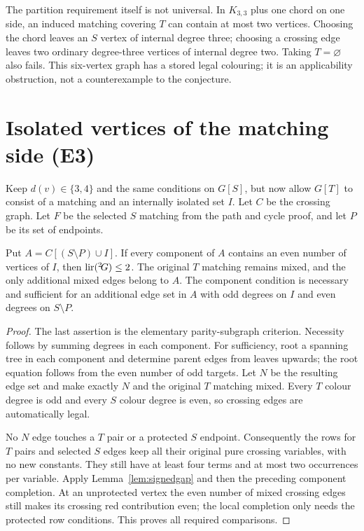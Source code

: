 The partition requirement itself is not universal. In $K_{3,3}$ plus
one chord on one side, an induced matching covering $T$ can contain at
most two vertices. Choosing the chord leaves an $S$ vertex of internal
degree three; choosing a crossing edge leaves two ordinary degree-three
vertices of internal degree two. Taking $T=\varnothing$ also fails.
This six-vertex graph has a stored legal colouring; it is an applicability
obstruction, not a counterexample to the conjecture.

\section{Isolated vertices of the matching side (E3)}\label{sec:isolatepart}

Keep $d(v)\in\{3,4\}$ and the same conditions on $G[S]$, but now allow
$G[T]$ to consist of a matching and an internally isolated set $I$.
Let $C$ be the crossing graph. Let $F$ be the selected $S$ matching from
the path and cycle proof, and let $P$ be its set of endpoints.

\begin{theorem}\label{thm:protectedjoin}
Put $A=C[(S\setminus P)\cup I]$. If every component of $A$ contains
an even number of vertices of $I$, then $\operatorname{lir}({}^{2}\!G)\le2$.
The original $T$ matching remains mixed, and the only additional mixed
edges belong to $A$. The component condition is necessary and sufficient
for an additional edge set in $A$ with odd degrees on $I$ and even
degrees on $S\setminus P$.
\end{theorem}
\begin{proof}
The last assertion is the elementary parity-subgraph criterion. Necessity
follows by summing degrees in each component. For sufficiency, root a
spanning tree in each component and determine parent edges from leaves
upwards; the root equation follows from the even number of odd targets.
Let $N$ be the resulting edge set and make exactly $N$ and the original
$T$ matching mixed. Every $T$ colour degree is odd and every $S$ colour
degree is even, so crossing edges are automatically legal.

No $N$ edge touches a $T$ pair or a protected $S$ endpoint. Consequently
the rows for $T$ pairs and selected $S$ edges keep all their original
pure crossing variables, with no new constants. They still have at
least four terms and at most two occurrences per variable. Apply
Lemma~\ref{lem:signedgap} and then the preceding component completion.
At an unprotected vertex the even number of mixed crossing edges still
makes its crossing red contribution even; the local completion only
needs the protected row conditions. This proves all required comparisons.
\end{proof}

